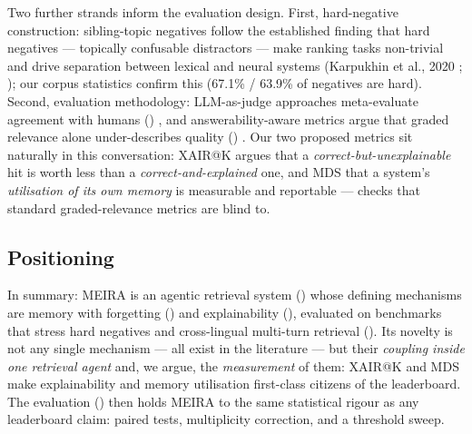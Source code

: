 Two further strands inform the evaluation design. First, hard-negative construction: sibling-topic negatives follow the established finding that hard negatives --- topically confusable distractors --- make ranking tasks non-trivial and drive separation between lexical and neural systems (Karpukhin et al., 2020 ; \citet{wischounig2026negative} ); our corpus statistics confirm this (67.1\% / 63.9\% of negatives are hard). Second, evaluation methodology: LLM-as-judge approaches meta-evaluate agreement with humans (\citep{li2024llmsjudges}) , and answerability-aware metrics argue that graded relevance alone under-describes quality (\citep{farzi2024exam}) . Our two proposed metrics sit naturally in this conversation: XAIR@K argues that a \emph{correct-but-unexplainable} hit is worth less than a \emph{correct-and-explained} one, and MDS that a system's \emph{utilisation of its own memory} is measurable and reportable --- checks that standard graded-relevance metrics are blind to.

\subsection{Positioning}
\label{sec:rw-positioning}

In summary: MEIRA is an agentic retrieval system () whose defining mechanisms are memory with forgetting () and explainability (), evaluated on benchmarks that stress hard negatives and cross-lingual multi-turn retrieval (). Its novelty is not any single mechanism --- all exist in the literature --- but their \emph{coupling inside one retrieval agent} and, we argue, the \emph{measurement} of them: XAIR@K and MDS make explainability and memory utilisation first-class citizens of the leaderboard. The evaluation () then holds MEIRA to the same statistical rigour as any leaderboard claim: paired tests, multiplicity correction, and a threshold sweep.
